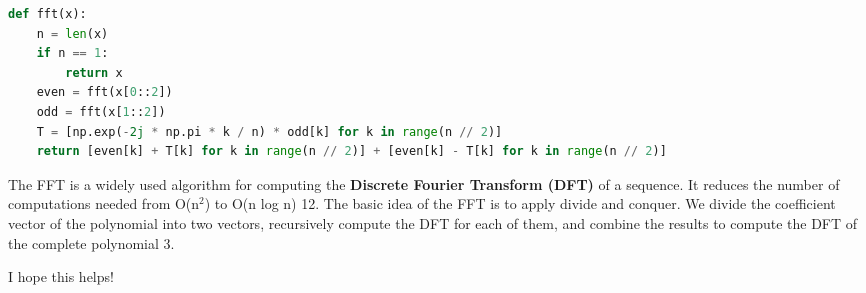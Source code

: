 \documentclass{mcmthesis}
\begin{document}
\begin{ReportAiUse}{9}
\begin{lstlisting}[language=python]
def fft(x):
    n = len(x)
    if n == 1:
        return x
    even = fft(x[0::2])
    odd = fft(x[1::2])
    T = [np.exp(-2j * np.pi * k / n) * odd[k] for k in range(n // 2)]
    return [even[k] + T[k] for k in range(n // 2)] + [even[k] - T[k] for k in range(n // 2)]
\end{lstlisting}
  The FFT is a widely used algorithm for computing the \textbf{Discrete Fourier Transform (DFT)} of a sequence. It reduces the number of computations needed from O(n$^2$) to O(n log n) 12. The basic idea of the FFT is to apply divide and conquer. We divide the coefficient vector of the polynomial into two vectors, recursively compute the DFT for each of them, and combine the results to compute the DFT of the complete polynomial 3.

  I hope this helps!

\end{ReportAiUse}
\end{document}
